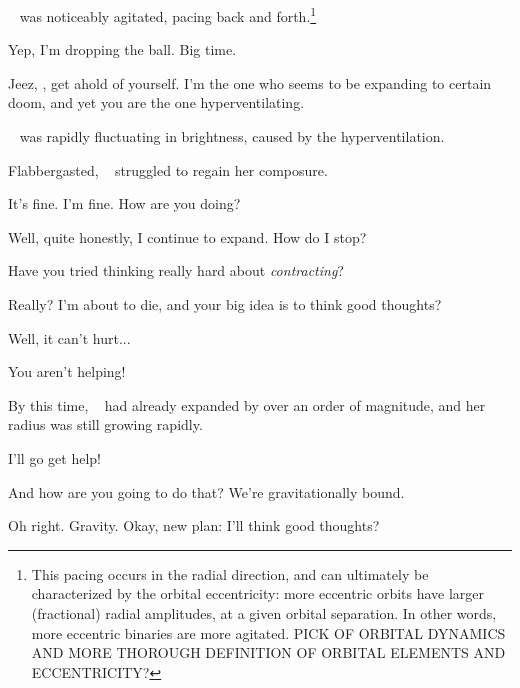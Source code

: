 \documentclass[main.tex]{subfiles}
\begin{document}
\par \nar \rmmaia~ was noticeably agitated, pacing back and forth.\footnote{This pacing occurs in the radial direction, and can ultimately be characterized by the orbital eccentricity:  more eccentric orbits have larger (fractional) radial amplitudes, at a given orbital separation.  In other words, more eccentric binaries are more agitated.  PICK OF ORBITAL DYNAMICS AND MORE THOROUGH DEFINITION OF ORBITAL ELEMENTS AND ECCENTRICITY?}

\par \Maia Yep, I'm dropping the ball.  Big time.

\par \Merope  Jeez, \rmmaia, get ahold of yourself.  I'm the one who seems to be expanding to certain doom, and yet you are the one hyperventilating.

\par \nar \rmmaia~ was rapidly fluctuating in brightness, caused by the hyperventilation.

\par \nar Flabbergasted, \rmmaia~ struggled to regain her composure.

\par \Maia It's fine.  I'm fine.  How are you doing?

\par \Merope Well, quite honestly, I continue to expand.  How do I stop?

\par \Maia Have you tried thinking really hard about \textit{contracting}?

\par \Merope Really?  I'm about to die, and your big idea is to think good thoughts?  

\par \Maia Well, it can't hurt...

\par \Merope You aren't helping!  

\par \nar By this time, \rmmerope~ had already expanded by over an order of magnitude, and her radius was still growing rapidly.  

\par \Maia I'll go get help!

\par \Merope And how are you going to do that?  We're gravitationally bound.

\par \Maia Oh right.  Gravity.  Okay, new plan:  I'll think good thoughts?
\end{document}
